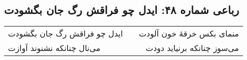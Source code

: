 \begin{center}
\section*{رباعی شماره ۴۸: ایدل چو فراقش رگ جان بگشودت}
\label{sec:sh048}
\begin{longtable}{l p{0.5cm} r}
ایدل چو فراقش رگ جان بگشودت
&&
منمای بکس خرقهٔ خون آلودت
\\
می‌نال چنانکه نشنوند آوازت
&&
می‌سوز چنانکه برنیاید دودت
\\
\end{longtable}
\end{center}
